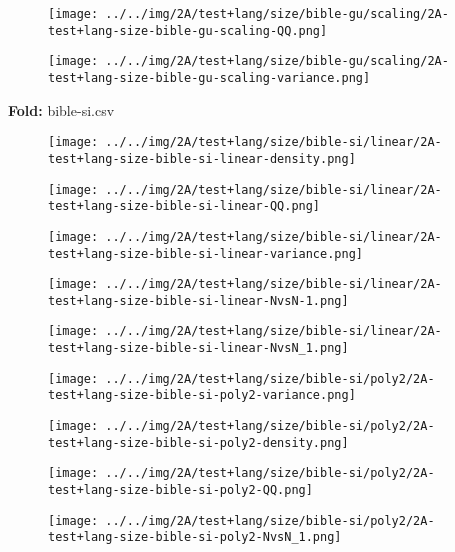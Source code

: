 \begin{figure}[H]
\centering	\texttt{[image: ../../img/2A/test+lang/size/bible-gu/scaling/2A-test+lang-size-bible-gu-scaling-QQ.png]}
\end{figure}
\begin{figure}[H]
\centering	\texttt{[image: ../../img/2A/test+lang/size/bible-gu/scaling/2A-test+lang-size-bible-gu-scaling-variance.png]}
\end{figure}
\textbf{Fold:} bible-si.csv
\begin{figure}[H]
\centering	\texttt{[image: ../../img/2A/test+lang/size/bible-si/linear/2A-test+lang-size-bible-si-linear-density.png]}
\end{figure}
\begin{figure}[H]
\centering	\texttt{[image: ../../img/2A/test+lang/size/bible-si/linear/2A-test+lang-size-bible-si-linear-QQ.png]}
\end{figure}
\begin{figure}[H]
\centering	\texttt{[image: ../../img/2A/test+lang/size/bible-si/linear/2A-test+lang-size-bible-si-linear-variance.png]}
\end{figure}
\begin{figure}[H]
\centering	\texttt{[image: ../../img/2A/test+lang/size/bible-si/linear/2A-test+lang-size-bible-si-linear-NvsN-1.png]}
\end{figure}
\begin{figure}[H]
\centering	\texttt{[image: ../../img/2A/test+lang/size/bible-si/linear/2A-test+lang-size-bible-si-linear-NvsN\_1.png]}
\end{figure}
\begin{figure}[H]
\centering	\texttt{[image: ../../img/2A/test+lang/size/bible-si/poly2/2A-test+lang-size-bible-si-poly2-variance.png]}
\end{figure}
\begin{figure}[H]
\centering	\texttt{[image: ../../img/2A/test+lang/size/bible-si/poly2/2A-test+lang-size-bible-si-poly2-density.png]}
\end{figure}
\begin{figure}[H]
\centering	\texttt{[image: ../../img/2A/test+lang/size/bible-si/poly2/2A-test+lang-size-bible-si-poly2-QQ.png]}
\end{figure}
\begin{figure}[H]
\centering	\texttt{[image: ../../img/2A/test+lang/size/bible-si/poly2/2A-test+lang-size-bible-si-poly2-NvsN\_1.png]}
\end{figure}
